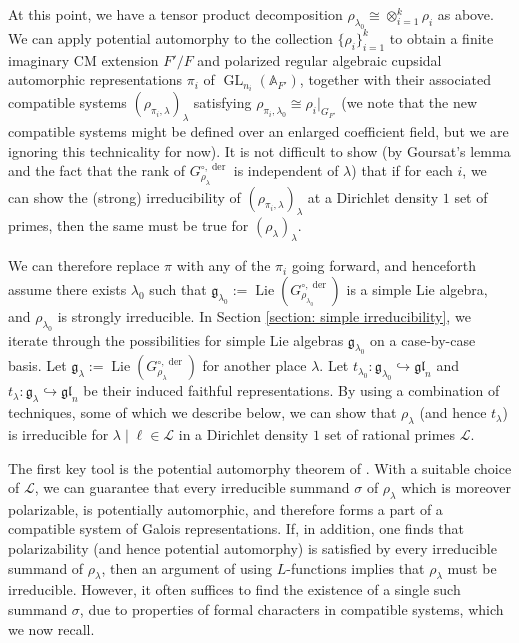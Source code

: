 \documentclass{amsart}
\theoremstyle{definition}
\numberwithin{equation}{section} %
\newcommand{\GL}{\operatorname{GL}}
\newcommand{\Lie}{\operatorname{Lie}}
\newcommand{\der}{\operatorname{der}}
\newcommand{\bb}[1]{\mathbb{#1}}
\newcommand{\mc}[1]{\mathcal{#1}}
\newcommand{\mf}[1]{\mathfrak{#1}}
\begin{document}
At this point, we have a tensor product decomposition \( \rho_{\lambda_0}\cong\otimes_{i=1}^k\rho_i \) as above. We can apply potential automorphy to the collection \( \{ \rho_i \}_{i=1}^k \) to obtain a finite imaginary CM extension \( F'/F \) and polarized regular algebraic cupsidal automorphic representations \( \pi_i \) of \( \GL_{n_i}(\bb{A}_{F'}) \), together with their associated compatible systems \( (\rho_{\pi_i,\lambda})_\lambda \) satisfying \( \rho_{\pi_i,\lambda_0}\cong \rho_i|_{G_{F'}} \) (we note that the new compatible systems might be defined over an enlarged coefficient field, but we are ignoring this technicality for now). It is not difficult to show (by Goursat's lemma and the fact that the rank of \( G_{\rho_\lambda}^{\circ,\der} \) is independent of \( \lambda \)) that if for each \( i \), we can show the (strong) irreducibility of \( (\rho_{\pi_i,\lambda})_\lambda \) at a Dirichlet density \( 1 \) set of primes, then the same must be true for \( (\rho_\lambda)_\lambda \). 

We can therefore replace \( \pi \) with any of the \( \pi_i \) going forward, and henceforth assume there exists \( \lambda_0 \) such that \( \mf{g}_{\lambda_0} := \Lie(G_{\rho_{\lambda_0}}^{\circ,\der}) \) is a simple Lie algebra, and \( \rho_{\lambda_0} \) is strongly irreducible. In Section \ref{section: simple irreducibility}, we iterate through the possibilities for simple Lie algebras \( \mf{g}_{\lambda_0} \) on a case-by-case basis. Let \( \mf{g}_\lambda := \Lie(G_{\rho_{\lambda}}^{\circ,\der}) \) for another place \( \lambda \). Let \( t_{\lambda_0}: \mf{g}_{\lambda_0}\hookrightarrow \mf{gl}_n \) and \( t_{\lambda}:\mf{g}_{\lambda}\hookrightarrow \mf{gl}_n \) be their induced faithful representations. By using a combination of techniques, some of which we describe below, we can show that $\rho_\lambda$ (and hence \( t_{\lambda} \)) is irreducible for \( \lambda\mid\ell\in\mc{L} \) in a Dirichlet density \( 1 \) set of rational primes \( \mc{L} \).

The first key tool is the potential automorphy theorem of \cite{BLGGT14}.
With a suitable choice of $\mc{L}$, we can guarantee that every irreducible summand $\sigma$ of $\rho_\lambda$ which is moreover polarizable, is potentially automorphic, and therefore forms a part of a compatible system of Galois representations. 
If, in addition, one finds that polarizability (and hence potential automorphy) is satisfied by every irreducible summand of $\rho_\lambda$, then an argument of \cite{BLGGT14} using $L$-functions implies that $\rho_\lambda$ must be irreducible.
However, it often suffices to find the existence of a single such summand $\sigma$, due to properties of formal characters in compatible systems, which we now recall.
\end{document}

